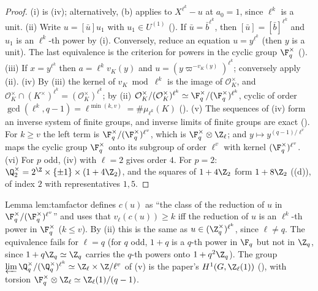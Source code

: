 \begin{proof}
(i) is (iv); alternatively, (b) applies to $X^{\ell^k}-u$ at $a_0=1$, since $\ell^k$ is a unit.
(ii) Write $u=[\bar u]u_1$ with $u_1\in U^{(1)}$ (). If $\bar u=\bar b^{\ell^k}$, then $[\bar u]=[\bar b]^{\ell^k}$ and $u_1$ is an
$\ell^k$-th power by (i). Conversely, reduce an equation $u=y^{\ell^k}$ (then $y$ is a unit). The last equivalence is the criterion for powers in the
cyclic group $\F_q^\times$ (). (iii) If $x=y^{\ell^k}$ then $a=\ell^kv_K(y)$ and $u=(y\varpi^{-v_K(y)})^{\ell^k}$; conversely apply (ii).
(iv) By (iii) the kernel of $v_K\bmod\ell^k$ is the image of $\mathcal O_K^\times$, and $\mathcal O_K^\times\cap(K^\times)^{\ell^k}=(\mathcal O_K^\times)^{\ell^k}$; by (ii)
$\mathcal O_K^\times/(\mathcal O_K^\times)^{\ell^k}\simeq\F_q^\times/(\F_q^\times)^{\ell^k}$, cyclic of order $\gcd(\ell^k,q-1)=\ell^{\min(k,v)}=\#\mu_{\ell^k}(K)$
(). (v) The sequences of (iv) form an inverse system of finite groups, and inverse limits of finite groups are exact
(). For $k\ge v$ the left term is $\F_q^\times/(\F_q^\times)^{\ell^v}$, which is $\F_q^\times\otimes\Z_\ell$; and $y\mapsto y^{(q-1)/\ell^v}$
maps the cyclic group $\F_q^\times$ onto its subgroup of order $\ell^v$ with kernel $(\F_q^\times)^{\ell^v}$. (vi) For $p$ odd, (iv) with $\ell=2$ gives
order $4$. For $p=2$: $\Q_2^\times=2^{\Z}\times\{\pm1\}\times(1+4\Z_2)$, and the squares of $1+4\Z_2$ form $1+8\Z_2$ ((d)),
of index $2$ with representatives $1,5$.
\end{proof}

\begin{paperlink}\label{pl:local:powers}
Lemma lem:tamfactor defines $c(u)$ as ``the class of the reduction of $u$ in $\F_q^\times/(\F_q^\times)^{\ell^{v}}$'' and uses that $v_\ell(c(u))\ge k$ iff the
reduction of $u$ is an $\ell^k$-th power in $\F_q^\times$ ($k\le v$). By (ii) this is the same as $u\in(\Z_q^\times)^{\ell^k}$, since
$\ell\ne q$. The equivalence fails for $\ell=q$ (for $q$ odd, $1+q$ is a $q$-th power in $\F_q$ but not in $\Z_q$, since $1+q\Z_q\simeq\Z_q$ carries the
$q$-th powers onto $1+q^2\Z_q$). The group $\varprojlim\Q_q^\times/(\Q_q^\times)^{\ell^k}\simeq\Z_\ell\times\Z/\ell^{v}$ of (v) is the paper's
$H^1(G,\Z_\ell(1))$ (), with torsion $\F_q^\times\otimes\Z_\ell\simeq\Z_\ell(1)/(q-1)$.
\end{paperlink}

